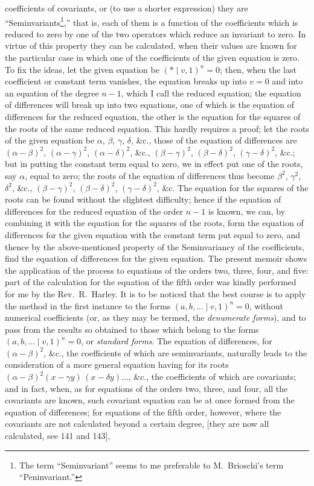 \documentclass[11pt]{article}
\newcommand{\Cdel}{\mid}
\begin{document}
\medskip

\noindent coefficients of covariants, or (to use a shorter expression) they are ``Seminvariants\footnote{The term ``Seminvariant'' seems to me preferable to M.~Brioschi's term ``Peninvariant.''},'' that is, each of them is a function of the coefficients which is reduced to zero by one of the two operators which reduce an invariant to zero. In virtue of this property they can be calculated, when their values are known for the particular case in which one of the coefficients of the given equation is zero. To fix the ideas, let the given equation be $(*\Cdel v, 1)^n = 0$; then, when the last coefficient or constant term vanishes, the equation breaks up into $v = 0$ and into an equation of the degree $n - 1$, which I call the reduced equation; the equation of differences will break up into two equations, one of which is the equation of differences for the reduced equation, the other is the equation for the squares of the roots of the same reduced equation. This hardly requires a proof; let the roots of the given equation be $\alpha$, $\beta$, $\gamma$, $\delta$, \&c., those of the equation of differences are $(\alpha - \beta)^2$, $(\alpha - \gamma)^2$, $(\alpha - \delta)^2$, \&c., $(\beta - \gamma)^2$, $(\beta - \delta)^2$, $(\gamma - \delta)^2$, \&c.; but in putting the constant term equal to zero, we in effect put one of the roots, say $\alpha$, equal to zero; the roots of the equation of differences thus become $\beta^2$, $\gamma^2$, $\delta^2$, \&c., $(\beta - \gamma)^2$, $(\beta - \delta)^2$, $(\gamma - \delta)^2$, \&c. The equation for the squares of the roots can be found without the slightest difficulty; hence if the equation of differences for the reduced equation of the order $n - 1$ is known, we can, by combining it with the equation for the squares of the roots, form the equation of differences for the given equation with the constant term put equal to zero, and thence by the above-mentioned property of the Seminvariancy of the coefficients, find the equation of differences for the given equation. The present memoir shows the application of the process to equations of the orders two, three, four, and five: part of the calculation for the equation of the fifth order was kindly performed for me by the Rev.~R.~Harley. It is to be noticed that the best course is to apply the method in the first instance to the forms $(a, b, \ldots\Cdel v, 1)^n = 0$, without numerical coefficients (or, as they may be termed, the \textit{denumerate forms}), and to pass from the results so obtained to those which belong to the forms $(a, b, \ldots \mid v, 1)^n = 0$, or \textit{standard forms}. The equation of differences, for $(\alpha - \beta)^2$, \&c., the coefficients of which are seminvariants, naturally leads to the consideration of a more general equation having for its roots $(\alpha - \beta)^2 (x - \gamma y)\,(x - \delta y) \ldots$, \&c., the coefficients of which are covariants; and in fact, when, as for equations of the orders two, three, and four, all the covariants are known, such covariant equation can be at once formed from the equation of differences; for equations of the fifth order, however, where the covariants are not calculated beyond a certain degree, [they are now all calculated, see 141 and 143], 
\end{document}
